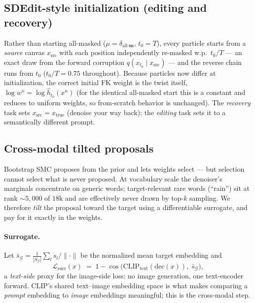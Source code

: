 \documentclass[11pt]{article}
\newcommand{\G}{\mathcal{G}}
\newcommand{\Ploss}{\mathcal{L}}
\newcommand{\dec}{\mathrm{dec}}
\newcommand{\mask}{\mathbf{m}}
\newcommand{\Lsurr}{\Ploss_{\mathrm{surr}}}
\begin{document}
\subsection{SDEdit-style initialization (editing and recovery)}
\label{sec:sdedit}
Rather than starting all-masked ($\mu = \delta_{\text{all-}\mask}$,
$t_0 = T$), every particle starts from a \emph{source} canvas
$x_{\mathrm{src}}$ with each position independently re-masked w.p.\
$t_0/T$ --- an exact draw from the forward corruption
$q(x_{t_0} \mid x_{\mathrm{src}})$ --- and the reverse chain runs from
$t_0$ ($t_0/T = 0.75$ throughout). Because particles now differ at
initialization, the correct initial FK weight is the twist itself,
$\log w^n = \log \hat h_{t_0}(x^n)$ (for the identical all-masked start
this is a constant and reduces to uniform weights, so from-scratch
behavior is unchanged). The \emph{recovery} task sets
$x_{\mathrm{src}} = x_{\mathrm{true}}$ (denoise your way back); the
\emph{editing} task sets it to a semantically different prompt.

\subsection{Cross-modal tilted proposals}
\label{sec:tilt}
Bootstrap SMC proposes from the prior and lets weights select --- but
selection cannot select what is never proposed. At vocabulary scale the
denoiser's marginals concentrate on generic words; target-relevant rare
words (``rain'') sit at rank ${\sim}5{,}000$ of $18\mathrm{k}$ and are
effectively never drawn by top-$k$ sampling. We therefore \emph{tilt} the
proposal toward the target using a differentiable surrogate, and pay for
it exactly in the weights.

\paragraph{Surrogate.} Let
$\bar s_\G = \frac{1}{|S_\G|}\sum_l s_l \big/ \|\cdot\|$ be the normalized
mean target embedding and
\begin{equation}
\Lsurr(x) \;=\; 1 - \cos\!\big( \mathrm{CLIP}_{\mathrm{text}}(\dec(x)),\;
\bar s_\G \big),
\end{equation}
a \emph{text-side} proxy for the image-side loss: no image generation, one
text-encoder forward. CLIP's shared text--image embedding space is what
makes comparing a \emph{prompt} embedding to \emph{image} embeddings
meaningful; this is the cross-modal step.
\end{document}
